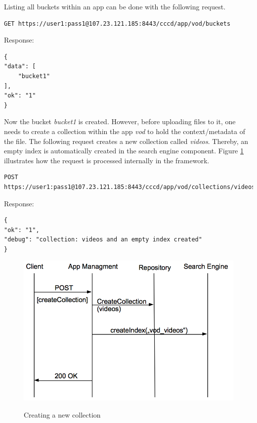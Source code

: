 Listing all buckets within an app can be done with the following request.
\begin{code}
\begin{verbatim}
GET https://user1:pass1@107.23.121.185:8443/cccd/app/vod/buckets
\end{verbatim}
Response:
\begin{verbatim}
{
"data": [
	"bucket1"
],
"ok": "1"
}
\end{verbatim}
\end{code}

Now the bucket \textit{bucket1} is created. However, before uploading files to it, one needs to create a collection within the app \textit{vod} to hold the context/metadata of the file. The following request creates a new collection called \textit{videos}. Thereby, an empty index is automatically created in the search engine component. Figure \ref{fig:newCollection} illustrates how the request is processed internally in the framework.

\begin{code}
\begin{verbatim}
POST https://user1:pass1@107.23.121.185:8443/cccd/app/vod/collections/videos
\end{verbatim}
Response:
\begin{verbatim}
{
"ok": "1",
"debug": "collection: videos and an empty index created"
}
\end{verbatim}
\end{code}

\begin{figure}[htb]
  \centering
  \includegraphics[scale=0.6]{flows/newCollectionFlow.png}\\
  \caption{Creating a new collection}
  \label{fig:newCollection}
\end{figure}

